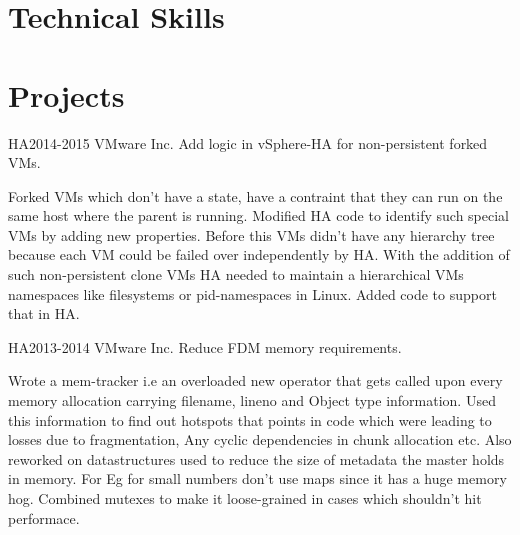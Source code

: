 \documentclass[10pt]{article} %
\begin{document}

\section{Technical Skills}


\section{Projects}

\project
{HA}{2014-2015}
{VMware Inc.}
{Add logic in vSphere-HA for non-persistent forked VMs.}
{\begin{itemize-noindent}
\item{Forked VMs which don't have a state, have a contraint that
they can run on the same host where the parent is running. Modified
HA code to identify such special VMs by adding new properties. Before
this VMs didn't have any hierarchy tree because each VM could be failed
over independently by HA. With the addition of such non-persistent clone
VMs HA needed to maintain a hierarchical VMs namespaces like filesystems
or pid-namespaces in Linux. Added code to support that in HA.
}
\end{itemize-noindent}}

\project
{HA}{2013-2014}
{VMware Inc.}
{Reduce FDM memory requirements.}
{\begin{itemize-noindent}
\item{Wrote a mem-tracker i.e an overloaded new operator that gets
called upon every memory allocation carrying filename, lineno and
Object type information. Used this information to find out hotspots
that points in code which were leading to losses due to fragmentation,
Any cyclic dependencies in chunk allocation etc. Also reworked on
datastructures used to reduce the size of metadata the master holds
in memory. For Eg for small numbers don't use maps since it has a huge
memory hog. Combined mutexes to make it loose-grained in cases which
shouldn't hit performace.}
\end{itemize-noindent}}
\end{document}
